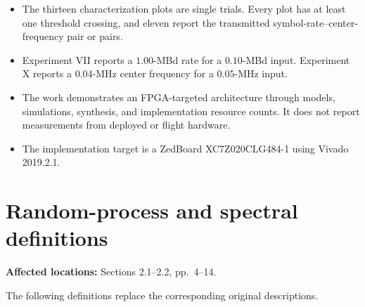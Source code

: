 \documentclass[12pt]{article}
\begin{document}
\begin{itemize}
  \item The thirteen characterization plots are single trials. Every plot has at least one threshold crossing, and eleven report the transmitted symbol-rate--center-frequency pair or pairs.
  \item Experiment VII reports a $1.00$-MBd rate for a $0.10$-MBd input. Experiment X reports a $0.04$-MHz center frequency for a $0.05$-MHz input.
  \item The work demonstrates an FPGA-targeted architecture through models, simulations, synthesis, and implementation resource counts. It does not report measurements from deployed or flight hardware.
  \item The implementation target is a ZedBoard XC7Z020\hspace{0pt}CLG484-1 using Vivado 2019.2.1.
\end{itemize}

\section{Random-process and spectral definitions}

\noindent\textbf{Affected locations:} Sections 2.1--2.2, pp.~4--14.

The following definitions replace the corresponding original descriptions.
\end{document}
